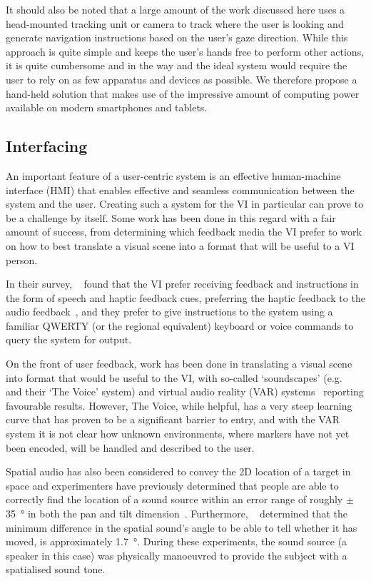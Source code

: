 \documentclass[format=sigconf, review=true, screen=true, anonymous=true]{acmart}
\begin{document}
It should also be noted that a large amount of the work discussed here uses a head-mounted tracking unit or camera to track where the user is looking and generate navigation instructions based on the user's gaze direction. While this approach is quite simple and keeps the user's hands free to perform other actions, it is quite cumbersome and in the way and the ideal system would require the user to rely on as few apparatus and devices as possible. We therefore propose a hand-held solution that makes use of the impressive amount of computing power available on modern smartphones and tablets. 

\subsection{Interfacing}

An important feature of a user-centric system is an effective human-machine interface (HMI) that enables effective and seamless communication between the system and the user. Creating such a system for the VI in particular can prove to be a challenge by itself. Some work has been done in this regard with a fair amount of success, from determining which feedback media the VI prefer to work on how to best translate a visual scene into a format that will be useful to a VI person. 

In their survey, \citeauthor{khoo2016multimodal}~\cite{khoo2016multimodal} found that the VI prefer receiving feedback and instructions in the form of speech and haptic feedback cues, preferring the haptic feedback to the audio feedback~\cite{ross2000wearable}, and they prefer to give instructions to the system using a familiar QWERTY (or the regional equivalent) keyboard or voice commands to query the system for output. 

On the front of user feedback, work has been done in translating a visual scene into format that would be useful to the VI, with so-called `soundscapes' (e.g. \citeauthor{meijer2010}~\cite{meijer2010} and their `The Voice' system) and virtual audio reality (VAR) systems~\cite{frauenberger2003} reporting favourable results. However, The Voice, while helpful, has a very steep learning curve that has proven to be a significant barrier to entry, and with the VAR system it is not clear how unknown environments, where markers have not yet been encoded, will be handled and described to the user. 

Spatial audio has also been considered to convey the 2D location of a target in space and experimenters have previously determined that people are able to correctly find the location of a sound source within an error range of roughly $\pm$\SI{35}{\degree} in both the pan and tilt dimension~\cite{zwiers2001spatial}. Furthermore, \citeauthor{ashmead1998spatial}~\cite{ashmead1998spatial} determined that the minimum difference in the spatial sound's angle to be able to tell whether it has moved, is approximately \SI{1.7}{\degree}. During these experiments, the sound source (a speaker in this case) was physically manoeuvred to provide the subject with a spatialised sound tone. 
\end{document}
